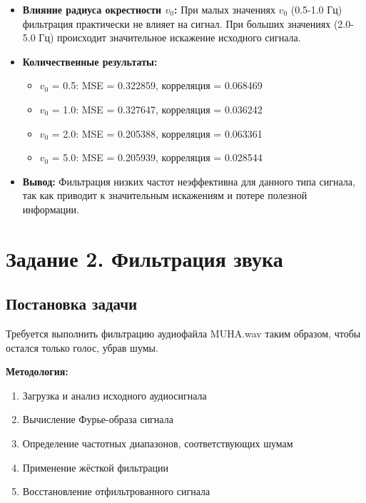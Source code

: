 \begin{itemize}
    \item \textbf{Влияние радиуса окрестности $v_0$:} При малых значениях $v_0$ (0.5-1.0 Гц) фильтрация практически не влияет на сигнал. При больших значениях (2.0-5.0 Гц) происходит значительное искажение исходного сигнала.
    
    \item \textbf{Количественные результаты:}
    \begin{itemize}
        \item $v_0$ = 0.5: MSE = 0.322859, корреляция = 0.068469
        \item $v_0$ = 1.0: MSE = 0.327647, корреляция = 0.036242
        \item $v_0$ = 2.0: MSE = 0.205388, корреляция = 0.063361
        \item $v_0$ = 5.0: MSE = 0.205939, корреляция = 0.028544
    \end{itemize}
    
    \item \textbf{Вывод:} Фильтрация низких частот неэффективна для данного типа сигнала, так как приводит к значительным искажениям и потере полезной информации.
\end{itemize}

\section*{Задание 2. Фильтрация звука}

\subsection*{Постановка задачи}

Требуется выполнить фильтрацию аудиофайла MUHA.wav таким образом, чтобы остался только голос, убрав шумы.

\textbf{Методология:}
\begin{enumerate}
    \item Загрузка и анализ исходного аудиосигнала
    \item Вычисление Фурье-образа сигнала
    \item Определение частотных диапазонов, соответствующих шумам
    \item Применение жёсткой фильтрации
    \item Восстановление отфильтрованного сигнала
\end{enumerate}

